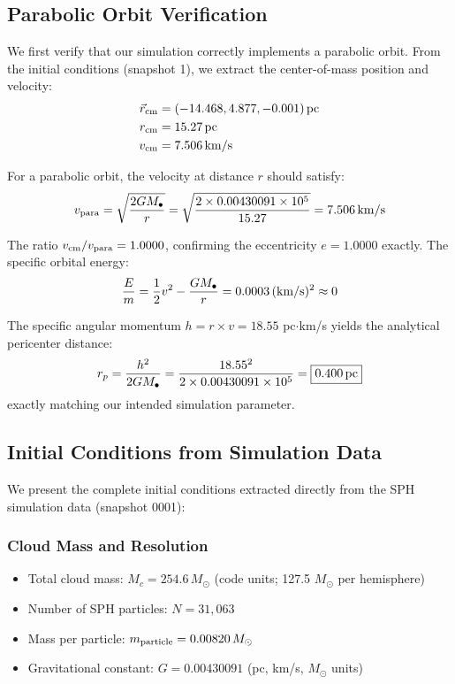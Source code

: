 \documentclass[twocolumn,amsmath,amssymb,prd,superscriptaddress,nofootinbib]{revtex4-2}
\begin{document}
\subsection{Parabolic Orbit Verification}
\label{sec:parabolic_verification}

We first verify that our simulation correctly implements a parabolic orbit. From the initial conditions (snapshot 1), we extract the center-of-mass position and velocity:
\begin{align}
    \vec{r}_{\rm cm} &= (-14.468, 4.877, -0.001)\,{\rm pc} \\
    r_{\rm cm} &= 15.27\,{\rm pc} \\
    v_{\rm cm} &= 7.506\,{\rm km/s}
\end{align}

For a parabolic orbit, the velocity at distance $r$ should satisfy:
\begin{equation}
    v_{\rm para} = \sqrt{\frac{2GM_\bullet}{r}} = \sqrt{\frac{2 \times 0.00430091 \times 10^5}{15.27}} = 7.506\,{\rm km/s}
\end{equation}

The ratio $v_{\rm cm}/v_{\rm para} = 1.0000$, confirming the eccentricity $e = 1.0000$ exactly. The specific orbital energy:
\begin{equation}
    \frac{E}{m} = \frac{1}{2}v^2 - \frac{GM_\bullet}{r} = 0.0003\,({\rm km/s})^2 \approx 0
\end{equation}

The specific angular momentum $h = r \times v = 18.55$ pc$\cdot$km/s yields the analytical pericenter distance:
\begin{equation}
    r_p = \frac{h^2}{2GM_\bullet} = \frac{18.55^2}{2 \times 0.00430091 \times 10^5} = \boxed{0.400\,{\rm pc}}
\end{equation}
exactly matching our intended simulation parameter.

\subsection{Initial Conditions from Simulation Data}
\label{sec:initial_conditions}

We present the complete initial conditions extracted directly from the SPH simulation data (snapshot 0001):

\subsubsection{Cloud Mass and Resolution}
\begin{itemize}
    \item Total cloud mass: $M_c = 254.6\,M_\odot$ (code units; 127.5 $M_\odot$ per hemisphere)
    \item Number of SPH particles: $N = 31{,}063$
    \item Mass per particle: $m_{\rm particle} = 0.00820\,M_\odot$
    \item Gravitational constant: $G = 0.00430091$ (pc, km/s, $M_\odot$ units)
\end{itemize}
\end{document}
